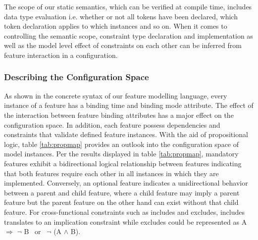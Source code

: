 \documentclass[conference]{IEEEtran}
\begin{document}
The scope of our static semantics, which can be verified  at compile time, includes data type evaluation i.e.  whether or not all tokens have been declared, which token declaration applies to which instances and so on. When it comes to controlling the semantic scope, constraint type declaration and implementation as well as the model level effect of constraints on each other can be inferred from feature interaction in a configuration.

\subsubsection{Describing the Configuration Space}
As shown in the concrete syntax of our feature modelling language, every instance of a feature has a binding time and binding mode attribute. The effect of the interaction between feature binding attributes has a major effect on the configuration space. In addition, each feature possess dependencies and constraints that validate defined feature instances. With the aid of propositional logic, table \ref{tab:propmap} provides an outlook into the configuration space of model instances. Per the results displayed in table \ref{tab:propmap}, mandatory features exhibit a bidirectional logical relationship between features indicating that both features require each other in all instances in which they are implemented. Conversely, an optional feature indicates a unidirectional behavior between a parent and child feature, where a child feature may imply a parent feature but the parent feature on the other hand can exist without that child feature. For cross-functional constraints such as includes and excludes, includes translates to an implication constraint while excludes could be represented as  A $\Rightarrow$ $\neg$ B \ or \ $\neg$ (A $\land$ B).
\end{document}
